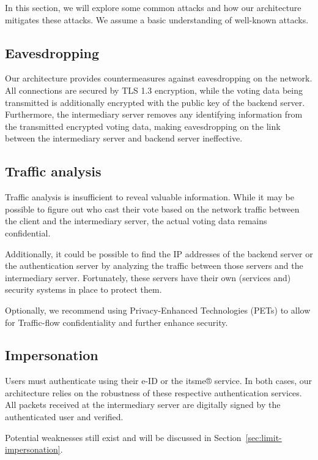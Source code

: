 \documentclass[a4paper,12pt,english]{article}
\begin{document}
In this section, we will explore some common attacks and how our architecture mitigates these attacks. We assume a basic understanding of well-known attacks.

\subsection{Eavesdropping}\label{sec:attack-eavesdropping}

Our architecture provides countermeasures against eavesdropping on the network. All connections are secured by TLS 1.3 encryption, while the voting data being transmitted is additionally encrypted with the public key of the backend server. Furthermore, the intermediary server removes any identifying information from the transmitted encrypted voting data, making eavesdropping on the link between the intermediary server and backend server ineffective.

\subsection{Traffic analysis}\label{sec:attack-traffic}

Traffic analysis is insufficient to reveal valuable information. While it may be possible to figure out who cast their vote based on the network traffic between the client and the intermediary server, the actual voting data remains confidential.

Additionally, it could be possible to find the IP addresses of the backend server or the authentication server by analyzing the traffic between those servers and the intermediary server. Fortunately, these servers have their own (services and) security systems in place to protect them.

Optionally, we recommend using Privacy-Enhanced Technologies (PETs) to allow for Traffic-flow confidentiality and further enhance security.

\subsection{Impersonation}\label{sec:attack-impersonation}

Users must authenticate using their e-ID or the itsme® service. In both cases, our architecture relies on the robustness of these respective authentication services. All packets received at the intermediary server are digitally signed by the authenticated user and verified.

Potential weaknesses still exist and will be discussed in Section~\ref{sec:limit-impersonation}.
\end{document}
